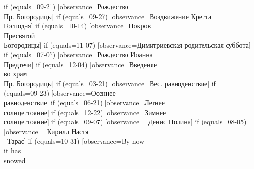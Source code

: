 {  if (equals=09-21) [observance=Рождество\\ Пр. Богородицы]
  if (equals=09-27) [observance=Воздвижение Креста\\ Господня]
  if (equals=10-14) [observance=Покров\\ Пресвятой\\ Богородицы]
  if (equals=11-07) [observance=Димитриевская родительская суббота]
  if (equals=07-07) [observance=Рождество Иоанна\\ Предтечи]
  if (equals=12-04) [observance=Введение\\ во храм\\ Пр. Богородицы]
  if (equals=03-21) [observance=Вес. равноденствие]
  if (equals=09-23) [observance=Осеннее\\ равноденствие]
  if (equals=06-21) [observance=Летнее\\ солнцестояние]
  if (equals=12-22) [observance=Зимнее\\ солнцестояние]
  if (equals=09-07) [observance=\married\ \mycm Денис Полина]
  if (equals=08-05) [observance=\married\ Кирилл Настя\\ \married\ Тарас]
  if (equals=10-31) [observance=By now\\ it has\\ snowed]
}
